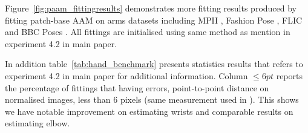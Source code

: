 Figure~\ref{fig:paam_fittingresults} demonstrates more fitting results produced by fitting patch-base AAM on arms datasets including MPII \cite{andriluka14cvpr}, Fashion Pose \cite{dantone2013human}, FLIC \cite{sapp2013modec} and BBC Poses \cite{pfister2015flowing}. All fittings are initialised using same method as mention in experiment 4.2 in main paper.

In addition table~\ref{tab:hand_benchmark} presents statistics results that refers to experiment 4.2 in main paper for additional information. Column $\leq 6pt$ reports the percentage of fittings that having errors, point-to-point distance on normalised images, less than 6 pixels (same measurement used in \cite{pfister2015flowing}). This shows we have notable improvement on estimating wrists and comparable results on estimating elbow.

{\small


}

















